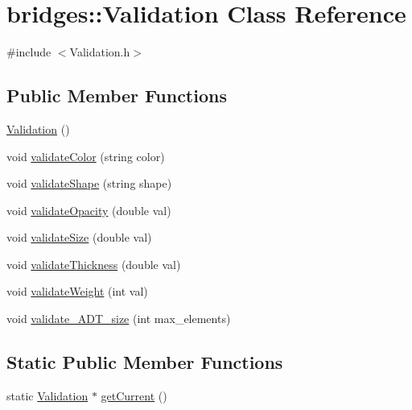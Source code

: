 \hypertarget{classbridges_1_1_validation}{}\section{bridges\+:\+:Validation Class Reference}
\label{classbridges_1_1_validation}


{\ttfamily \#include $<$Validation.\+h$>$}

\subsection*{Public Member Functions}
\begin{DoxyCompactItemize}
\item 
\hyperlink{classbridges_1_1_validation_af96b099ca6ce6cd4f408f1cead574d72}{Validation} ()
\item 
void \hyperlink{classbridges_1_1_validation_ae996957e1fc7f77ef49c31fbdb787933}{validate\+Color} (string color)
\item 
void \hyperlink{classbridges_1_1_validation_aeb22afdeb015c9d9015889a240918542}{validate\+Shape} (string shape)
\item 
void \hyperlink{classbridges_1_1_validation_a1e3a732becc5d60df177ac2db2795885}{validate\+Opacity} (double val)
\item 
void \hyperlink{classbridges_1_1_validation_a323312df77e8efe8382a25ff7295819d}{validate\+Size} (double val)
\item 
void \hyperlink{classbridges_1_1_validation_a234922474be2e46f8b34d50c618716a3}{validate\+Thickness} (double val)
\item 
void \hyperlink{classbridges_1_1_validation_a75e8636360983f0b12fb7e6581a02357}{validate\+Weight} (int val)
\item 
void \hyperlink{classbridges_1_1_validation_a79c78d43b8226b0b53da078458941117}{validate\+\_\+\+A\+D\+T\+\_\+size} (int max\+\_\+elements)
\end{DoxyCompactItemize}
\subsection*{Static Public Member Functions}
\begin{DoxyCompactItemize}
\item 
static \hyperlink{classbridges_1_1_validation}{Validation} $\ast$ \hyperlink{classbridges_1_1_validation_add1944b1167e0e6b1a80e303b3a16b5b}{get\+Current} ()
\end{DoxyCompactItemize}


